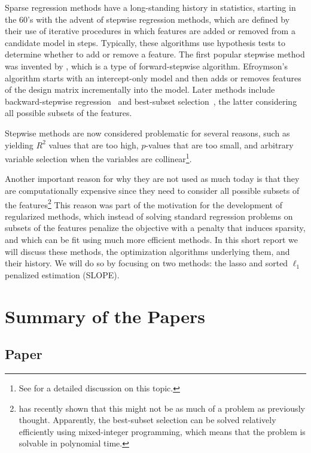 \documentclass{book}
\begin{document}
Sparse regression methods have a long-standing history in statistics, starting in the 60's with the advent of stepwise regression methods, which are defined by their use of iterative procedures in which features are added or removed from a candidate model in steps. Typically, these algorithms use hypothesis tests to determine whether to add or remove a feature.
The first popular stepwise method was invented by \textcite{efroymson1960}, which is a type of forward-stepwise algorithm. Efroymson's algorithm starts with an intercept-only model and then adds or removes features of the design matrix incrementally into the model. Later methods include backward-stepwise regression~\parencite{raiffa1968} and best-subset selection~\parencite{beale1967}, the latter considering all possible subsets of the features.

Stepwise methods are now considered problematic for several reasons, such as yielding \(R^2\) values that are too high, \(p\)-values that are too small, and arbitrary variable selection when the variables are collinear\footnote{See \textcite[Chapter 4.3]{harrell2015} for a detailed discussion on this topic.}.

Another important reason for why they are not used as much today is that they are computationally expensive since they need to consider all possible subsets of the features\footnote{\textcite{bertsimas2016} has recently shown that this might not be as much of a problem as previously thought. Apparently, the best-subset selection can be solved relatively efficiently using mixed-integer programming, which means that the problem is solvable in polynomial time.} This reason was part of the motivation for the development of regularized methods, which instead of solving standard regression problems on subsets of the features penalize the objective with a penalty that induces sparsity, and which can be fit using much more efficient methods. In this short report we will discuss these methods, the optimization algorithms underlying them, and their history. We will do so by focusing on two methods: the lasso and sorted \(\ell_1\) penalized estimation (SLOPE).


\section{Summary of the Papers}

\subsection{Paper \I}
\end{document}
